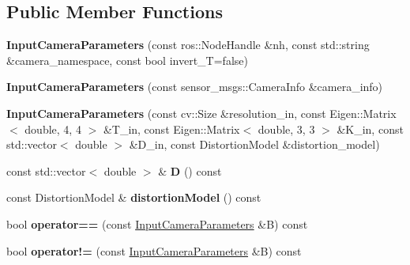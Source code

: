 \subsection*{Public Member Functions}
\begin{DoxyCompactItemize}
\item 
\mbox{\label{classimage__undistort_1_1InputCameraParameters_a33bd851feb1a1eb1bd16243f06c200dc}} 
{\bfseries Input\+Camera\+Parameters} (const ros\+::\+Node\+Handle \&nh, const std\+::string \&camera\+\_\+namespace, const bool invert\+\_\+T=false)
\item 
\mbox{\label{classimage__undistort_1_1InputCameraParameters_a547a641f1838cf2039107f4e2ee12807}} 
{\bfseries Input\+Camera\+Parameters} (const sensor\+\_\+msgs\+::\+Camera\+Info \&camera\+\_\+info)
\item 
\mbox{\label{classimage__undistort_1_1InputCameraParameters_af6b25a0e4ae5dbe0b1ca2281ad47fc9f}} 
{\bfseries Input\+Camera\+Parameters} (const cv\+::\+Size \&resolution\+\_\+in, const Eigen\+::\+Matrix$<$ double, 4, 4 $>$ \&T\+\_\+in, const Eigen\+::\+Matrix$<$ double, 3, 3 $>$ \&K\+\_\+in, const std\+::vector$<$ double $>$ \&D\+\_\+in, const Distortion\+Model \&distortion\+\_\+model)
\item 
\mbox{\label{classimage__undistort_1_1InputCameraParameters_a04944a2e3227ca7c1c2fd45f24fca350}} 
const std\+::vector$<$ double $>$ \& {\bfseries D} () const
\item 
\mbox{\label{classimage__undistort_1_1InputCameraParameters_ac5ea174097c615b5b49ffa6df47d7c4b}} 
const Distortion\+Model \& {\bfseries distortion\+Model} () const
\item 
\mbox{\label{classimage__undistort_1_1InputCameraParameters_a5c9c728eb090a6a7836434be0a45f612}} 
bool {\bfseries operator==} (const \hyperlink{classimage__undistort_1_1InputCameraParameters}{Input\+Camera\+Parameters} \&B) const
\item 
\mbox{\label{classimage__undistort_1_1InputCameraParameters_ae89f73ebec8690dfff2061c04131ad02}} 
bool {\bfseries operator!=} (const \hyperlink{classimage__undistort_1_1InputCameraParameters}{Input\+Camera\+Parameters} \&B) const
\end{DoxyCompactItemize}


